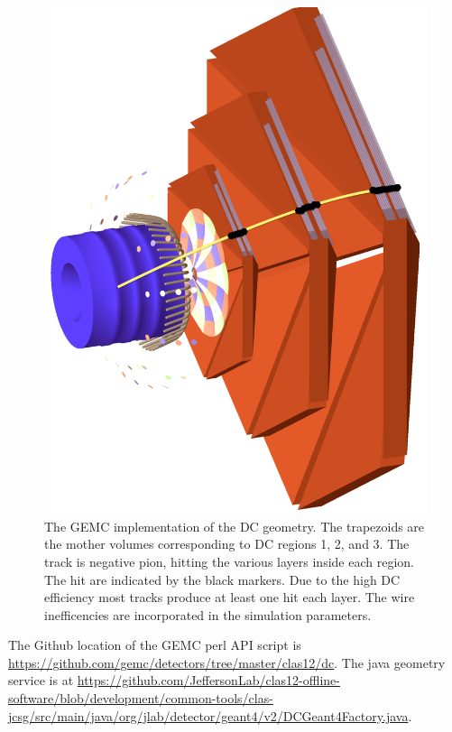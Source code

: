\begin{figure}[h]
	\centering
	\includegraphics[width=0.99\columnwidth,keepaspectratio]{img/dcGeometry.png}
	\caption{The GEMC implementation of the DC geometry.
             The trapezoids are the mother volumes corresponding to DC regions 1, 2, and 3. The track is negative pion,
			 hitting the various layers inside each region. The hit are indicated by the black markers. Due to the high DC
             efficiency most tracks produce at least one hit each layer. The wire inefficencies are incorporated in the simulation parameters. }
	\label{fig:dcGeometry}
\end{figure}

The Github location of the GEMC perl API script is \url{https://github.com/gemc/detectors/tree/master/clas12/dc}.
The java geometry service is at
\url{https://github.com/JeffersonLab/clas12-offline-software/blob/development/common-tools/clas-jcsg/src/main/java/org/jlab/detector/geant4/v2/DCGeant4Factory.java}.

